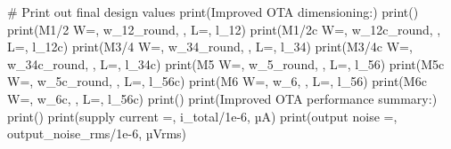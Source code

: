 \documentclass[
  a4paper,
  DIV=11,
  numbers=noendperiod]{scrartcl}
\newenvironment{Shaded}{\begin{snugshade}}{\end{snugshade}}
\newcommand{\BuiltInTok}[1]{\textcolor[rgb]{0.00,0.23,0.31}{#1}}
\newcommand{\CommentTok}[1]{\textcolor[rgb]{0.37,0.37,0.37}{#1}}
\newcommand{\FloatTok}[1]{\textcolor[rgb]{0.68,0.00,0.00}{#1}}
\newcommand{\NormalTok}[1]{\textcolor[rgb]{0.00,0.23,0.31}{#1}}
\newcommand{\OperatorTok}[1]{\textcolor[rgb]{0.37,0.37,0.37}{#1}}
\newcommand{\StringTok}[1]{\textcolor[rgb]{0.13,0.47,0.30}{#1}}
\begin{document}
\begin{tcolorbox}
\begin{Shaded}
\begin{Highlighting}[]
\CommentTok{\# Print out final design values}
\BuiltInTok{print}\NormalTok{(}\StringTok{\textquotesingle{}Improved OTA dimensioning:\textquotesingle{}}\NormalTok{)}
\BuiltInTok{print}\NormalTok{(}\StringTok{\textquotesingle{}{-}{-}{-}{-}{-}{-}{-}{-}{-}{-}{-}{-}{-}{-}{-}{-}{-}{-}{-}{-}{-}{-}{-}{-}{-}{-}\textquotesingle{}}\NormalTok{)}
\BuiltInTok{print}\NormalTok{(}\StringTok{\textquotesingle{}M1/2  W=\textquotesingle{}}\NormalTok{, w\_12\_round, }\StringTok{\textquotesingle{}, L=\textquotesingle{}}\NormalTok{, l\_12)}
\BuiltInTok{print}\NormalTok{(}\StringTok{\textquotesingle{}M1/2c W=\textquotesingle{}}\NormalTok{, w\_12c\_round, }\StringTok{\textquotesingle{}, L=\textquotesingle{}}\NormalTok{, l\_12c)}
\BuiltInTok{print}\NormalTok{(}\StringTok{\textquotesingle{}M3/4  W=\textquotesingle{}}\NormalTok{, w\_34\_round, }\StringTok{\textquotesingle{}, L=\textquotesingle{}}\NormalTok{, l\_34)}
\BuiltInTok{print}\NormalTok{(}\StringTok{\textquotesingle{}M3/4c W=\textquotesingle{}}\NormalTok{, w\_34c\_round, }\StringTok{\textquotesingle{}, L=\textquotesingle{}}\NormalTok{, l\_34c)}
\BuiltInTok{print}\NormalTok{(}\StringTok{\textquotesingle{}M5   W=\textquotesingle{}}\NormalTok{, w\_5\_round, }\StringTok{\textquotesingle{}, L=\textquotesingle{}}\NormalTok{, l\_56)}
\BuiltInTok{print}\NormalTok{(}\StringTok{\textquotesingle{}M5c  W=\textquotesingle{}}\NormalTok{, w\_5c\_round, }\StringTok{\textquotesingle{}, L=\textquotesingle{}}\NormalTok{, l\_56c)}
\BuiltInTok{print}\NormalTok{(}\StringTok{\textquotesingle{}M6   W=\textquotesingle{}}\NormalTok{, w\_6, }\StringTok{\textquotesingle{}, L=\textquotesingle{}}\NormalTok{, l\_56)}
\BuiltInTok{print}\NormalTok{(}\StringTok{\textquotesingle{}M6c  W=\textquotesingle{}}\NormalTok{, w\_6c, }\StringTok{\textquotesingle{}, L=\textquotesingle{}}\NormalTok{, l\_56c)}
\BuiltInTok{print}\NormalTok{()}
\BuiltInTok{print}\NormalTok{(}\StringTok{\textquotesingle{}Improved OTA performance summary:\textquotesingle{}}\NormalTok{)}
\BuiltInTok{print}\NormalTok{(}\StringTok{\textquotesingle{}{-}{-}{-}{-}{-}{-}{-}{-}{-}{-}{-}{-}{-}{-}{-}{-}{-}{-}{-}{-}{-}{-}{-}{-}{-}{-}{-}{-}{-}{-}{-}{-}{-}\textquotesingle{}}\NormalTok{)}
\BuiltInTok{print}\NormalTok{(}\StringTok{\textquotesingle{}supply current =\textquotesingle{}}\NormalTok{, i\_total}\OperatorTok{/}\FloatTok{1e{-}6}\NormalTok{, }\StringTok{\textquotesingle{}µA\textquotesingle{}}\NormalTok{)}
\BuiltInTok{print}\NormalTok{(}\StringTok{\textquotesingle{}output noise =\textquotesingle{}}\NormalTok{, output\_noise\_rms}\OperatorTok{/}\FloatTok{1e{-}6}\NormalTok{, }\StringTok{\textquotesingle{}µVrms\textquotesingle{}}\NormalTok{)}

\end{Highlighting}
\end{Shaded}
\end{tcolorbox}
\end{document}

